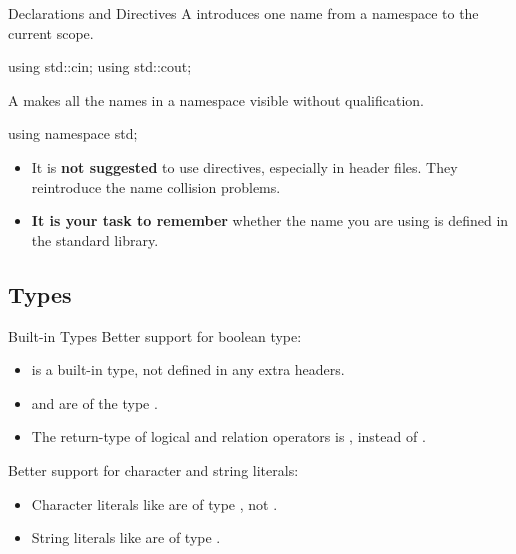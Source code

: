 \documentclass{beamer}
\begin{document}
\begin{frame}[fragile]{ Declarations and Directives}
    A   introduces one name from a namespace to the current scope.
    \begin{cpp}
using std::cin;
using std::cout;
    \end{cpp}
    \pause
    A   makes all the names in a namespace visible without qualification.
    \begin{cpp}
using namespace std;
    \end{cpp}
    \begin{itemize}
        \item It is \textbf{not suggested} to use  directives, especially in header files. They reintroduce the name collision problems.
        \item \textbf{It is your task to remember} whether the name you are using is defined in the standard library.
    \end{itemize}
\end{frame}

\subsection{Types}

\begin{frame}{Built-in Types}
    Better support for boolean type:
    \begin{itemize}
        \item {} is a built-in type, not defined in any extra headers.
        \item {} and  are of the type .
        \item The return-type of logical and relation operators is , instead of .
    \end{itemize}
    \pause
    Better support for character and string literals:
    \begin{itemize}
        \item Character literals like  are of type , not .
        \item String literals like  are of type \ttt{[N+1]}.
    \end{itemize}
\end{frame}
\end{document}
